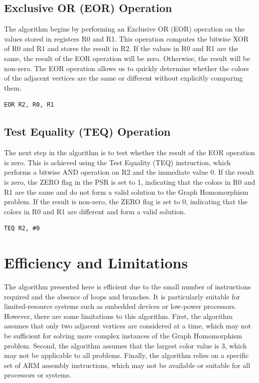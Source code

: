 \subsection{Exclusive OR (EOR) Operation}

The algorithm begins by performing an Exclusive OR (EOR) operation on the values stored in registers R0 and R1. This operation computes the bitwise XOR of R0 and R1 and stores the result in R2. If the values in R0 and R1 are the same, the result of the EOR operation will be zero. Otherwise, the result will be non-zero. The EOR operation allows us to quickly determine whether the colors of the adjacent vertices are the same or different without explicitly comparing them.

\begin{verbatim}
EOR R2, R0, R1
\end{verbatim}

\subsection{Test Equality (TEQ) Operation}

The next step in the algorithm is to test whether the result of the EOR operation is zero. This is achieved using the Test Equality (TEQ) instruction, which performs a bitwise AND operation on R2 and the immediate value 0. If the result is zero, the ZERO flag in the PSR is set to 1, indicating that the colors in R0 and R1 are the same and do not form a valid solution to the Graph Homomorphism problem. If the result is non-zero, the ZERO flag is set to 0, indicating that the colors in R0 and R1 are different and form a valid solution.

\begin{verbatim}
TEQ R2, #0
\end{verbatim}

\section{Efficiency and Limitations}

The algorithm presented here is efficient due to the small number of instructions required and the absence of loops and branches. It is particularly suitable for limited-resource systems such as embedded devices or low-power processors. However, there are some limitations to this algorithm. First, the algorithm assumes that only two adjacent vertices are considered at a time, which may not be sufficient for solving more complex instances of the Graph Homomorphism problem. Second, the algorithm assumes that the largest color value is 3, which may not be applicable to all problems. Finally, the algorithm relies on a specific set of ARM assembly instructions, which may not be available or suitable for all processors or systems.

